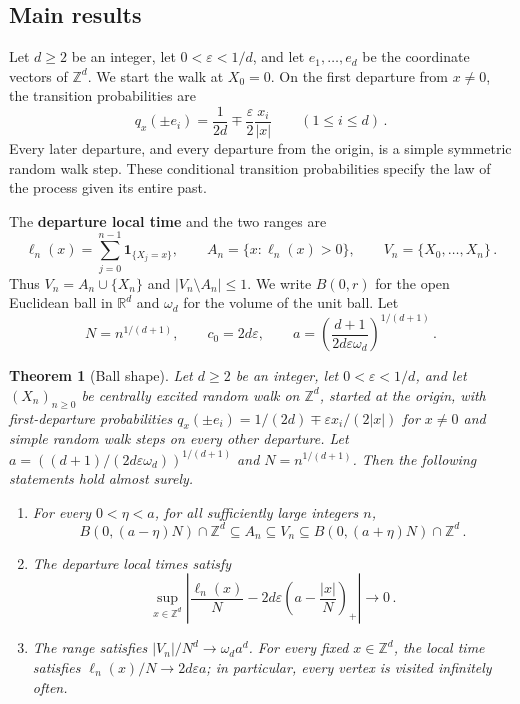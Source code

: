 \documentclass[11pt]{amsart}
\theoremstyle{plain}
\newtheorem{theorem}{Theorem}[section]
\theoremstyle{definition}
\newcommand{\Z}{\mathbb Z}
\newcommand{\R}{\mathbb R}
\newcommand{\eps}{\varepsilon}
\newcommand{\ind}{\mathbf 1}
\newcommand{\defn}[1]{\textbf{#1}}
\begin{document}
\subsection{Main results}

Let $d\geq2$ be an integer, let $0<\eps<1/d$, and let
$e_1,\ldots,e_d$ be the coordinate vectors of $\Z^d$.
We start the walk at $X_0=0$. On the first departure from $x\ne0$,
the transition probabilities are
\begin{equation}\label{eq:kernel}
q_x(\pm e_i)=\frac1{2d}\mp\frac\eps2\frac{x_i}{|x|}
\qquad (1\leq i\leq d)\, .
\end{equation}
Every later departure, and every departure from the origin, is a simple
symmetric random walk step. These conditional transition probabilities
specify the law of the process given its entire past.



The \defn{departure local time} and the two ranges are
\begin{equation}\label{eq:local-range}
\ell_n(x)=\sum_{j=0}^{n-1}\ind_{\{X_j=x\}} ,
\qquad A_n=\{x:\ell_n(x)>0\} ,
\qquad V_n=\{X_0,\ldots,X_n\}\, .
\end{equation}
Thus $V_n=A_n\cup\{X_n\}$ and $|V_n\setminus A_n|\leq1$.
We write $B(0,r)$ for the open Euclidean ball in $\R^d$ and
$\omega_d$ for the volume of the unit ball. Let
\begin{equation}\label{eq:scale}
N=n^{1/(d+1)} ,\qquad c_0=2d\eps ,\qquad
a=\left(\frac{d+1}{2d\eps\omega_d}\right)^{1/(d+1)}\, .
\end{equation}

\begin{theorem}[Ball shape]\label{thm:shape}
Let $d\geq2$ be an integer, let $0<\eps<1/d$, and let $(X_n)_{n\geq0}$
be centrally excited random walk on $\Z^d$, started at the origin,
with first-departure probabilities
$q_x(\pm e_i)=1/(2d)\mp\eps x_i/(2|x|)$ for $x\ne0$ and simple
random walk steps on every other departure. Let
$a=((d+1)/(2d\eps\omega_d))^{1/(d+1)}$ and $N=n^{1/(d+1)}$.
Then the following statements hold almost surely.
\begin{enumerate}[label=\textup{(\roman*)}]
\item For every $0<\eta<a$, for all sufficiently large integers $n$,
\begin{equation}\label{eq:shape}
B(0,(a-\eta)N)\cap\Z^d\subseteq A_n\subseteq V_n
\subseteq B(0,(a+\eta)N)\cap\Z^d\, .
\end{equation}
\item The departure local times satisfy
\begin{equation}\label{eq:profile-limit}
\sup_{x\in\Z^d}\left|
\frac{\ell_n(x)}N-2d\eps\left(a-\frac{|x|}N\right)_+
\right|\longrightarrow0\, .
\end{equation}
\item The range satisfies $|V_n|/N^d\longrightarrow\omega_da^d$.
For every fixed $x\in\Z^d$, the local time satisfies
$\ell_n(x)/N\longrightarrow2d\eps a$; in particular, every vertex
is visited infinitely often.
\end{enumerate}
\end{theorem}
\end{document}

